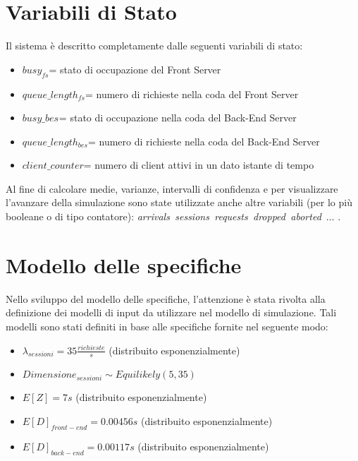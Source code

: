 \section{Variabili di Stato}
Il sistema è descritto completamente dalle seguenti variabili di stato:
\begin{itemize}
\item $busy_{fs}^{}$= stato di occupazione del Front Server
\item $queue\_length_{fs}^{}$= numero di richieste nella coda del Front Server
\item $busy\_{bes}^{}$= stato di occupazione nella coda del Back-End Server
\item $queue\_length_{bes}^{}$= numero di richieste nella coda del Back-End Server
\item $client\_counter$= numero di client attivi in un dato istante di tempo

\end{itemize}
Al fine di calcolare medie, varianze, intervalli di confidenza e per visualizzare l'avanzare della simulazione sono state utilizzate anche altre variabili (per lo più booleane o di tipo contatore): \textit{arrivals\, sessions\, requests\, dropped\, aborted\,} $…$ .

\section{Modello delle specifiche}
Nello sviluppo del modello delle specifiche, l'attenzione è stata rivolta alla definizione dei modelli di input da utilizzare nel modello di simulazione. Tali modelli sono stati definiti in base alle specifiche fornite nel seguente modo:

 \begin{itemize}
	\item $\lambda_{sessioni} = 35 \frac{richieste}{s}$ (distribuito esponenzialmente)
 	\item $Dimensione_{sessioni} \sim Equilikely(5, 35)$
 	\item $E[Z] = 7 s$ (distribuito esponenzialmente)
 	\item $E[D]_{front-end} = 0.00456 s$ (distribuito esponenzialmente)
 	\item $E[D]_{back-end} = 0.00117 s$ (distribuito esponenzialmente)
 \end{itemize} 

